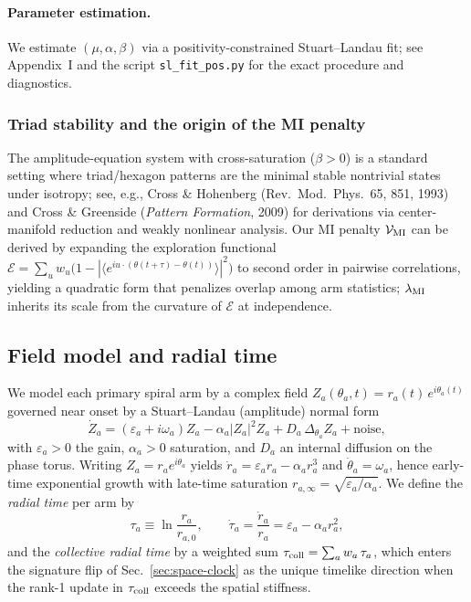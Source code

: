\documentclass[11pt]{article}
\begin{document}
\paragraph{Parameter estimation.}
We estimate $(\mu,\alpha,\beta)$ via a positivity-constrained Stuart--Landau fit; see Appendix~I
and the script \texttt{sl\_fit\_pos.py} for the exact procedure and diagnostics.

\subsubsection{Triad stability and the origin of the MI penalty}\label{subsub:triad-stability}
The amplitude-equation system with cross-saturation ($\beta>0$) is a standard setting where triad/hexagon patterns are the minimal stable nontrivial states under isotropy; see, e.g., Cross \& Hohenberg (Rev.\ Mod.\ Phys.\ 65, 851, 1993) and Cross \& Greenside (\emph{Pattern Formation}, 2009) for derivations via center-manifold reduction and weakly nonlinear analysis.
Our MI penalty $\mathcal V_{\rm MI}$ can be derived by expanding the exploration functional $\mathcal E=\sum_u w_u \big(1-|\langle e^{iu\cdot(\theta(t+\tau)-\theta(t))}\rangle|^2\big)$ to second order in pairwise correlations, yielding a quadratic form that penalizes overlap among arm statistics; $\lambda_{\rm MI}$ inherits its scale from the curvature of $\mathcal E$ at independence.


\subsection{Field model and radial time}
We model each primary spiral arm by a complex field $Z_a(\theta_a,t)=r_a(t)\,e^{i\theta_a(t)}$ governed near onset by a Stuart--Landau (amplitude) normal form
\begin{equation}
\dot Z_a = (\varepsilon_a + i\omega_a) Z_a - \alpha_a |Z_a|^2 Z_a + D_a\,\Delta_{\theta_a} Z_a + \text{noise},
\end{equation}
with $\varepsilon_a>0$ the gain, $\alpha_a>0$ saturation, and $D_a$ an internal diffusion on the phase torus.
Writing $Z_a=r_a e^{i\theta_a}$ yields $\dot r_a=\varepsilon_a r_a-\alpha_a r_a^3$ and $\dot\theta_a=\omega_a$, hence early-time exponential growth with late-time saturation $r_{a,\infty}=\sqrt{\varepsilon_a/\alpha_a}$.
We define the \emph{radial time} per arm by
\begin{equation}
\tau_a \equiv \ln\!\frac{r_a}{r_{a,0}}, \qquad \dot\tau_a=\frac{\dot r_a}{r_a}=\varepsilon_a-\alpha_a r_a^2,
\end{equation}
and the \emph{collective radial time} by a weighted sum $\tau_{\rm coll}=\sum_a w_a\,\tau_a$, which enters the signature flip of Sec.~\ref{sec:space-clock} as the unique timelike direction when the rank-1 update in $\tau_{\rm coll}$ exceeds the spatial stiffness.
\end{document}
